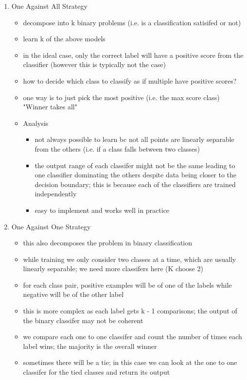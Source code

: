 \begin{enumerate}
    \item One Against All Strategy
    \begin{itemize}
        \item decompose into k binary problems (i.e. is a classification satisifed or not)
        \item learn k of the above models
        \item in the ideal case, only the correct label will have a positive score from the classifier (however this is typically not the case)
        \item how to decide which class to classify as if multiple have positive scores?
        \item one way is to just pick the most positive (i.e. the max score class) "Winner takes all"
        \item Analysis
        \begin{itemize}
            \item not always possible to learn bc not all points are linearly separable from the others (i.e. if a class falls between two classes)
            \item the output range of each classifer might not be the same leading to one classifier dominating the others despite data being closer to the decision boundary; this is because each of the classifiers are trained independently
            \item easy to implement and works well in practice
        \end{itemize}
    \end{itemize}
    \item One Against One Strategy
    \begin{itemize}
        \item this also decomposes the problem in binary classification
        \item while training we only consider two classes at a time, which are usually linearly separable; we need more classifers here (K choose 2)
        \item for each class pair, positive examples will be of one of the labels while negative will be of the other label
        \item this is more complex as each label gets k - 1 comparisons; the output of the binary classifer may not be coherent
        \item we compare each one to one classifer and count the number of times each label wins; the majority is the overall winner
        \item sometimes there will be a tie; in this case we can look at the one to one classifer for the tied classes and return its output
    \end{itemize}
\end{enumerate}


